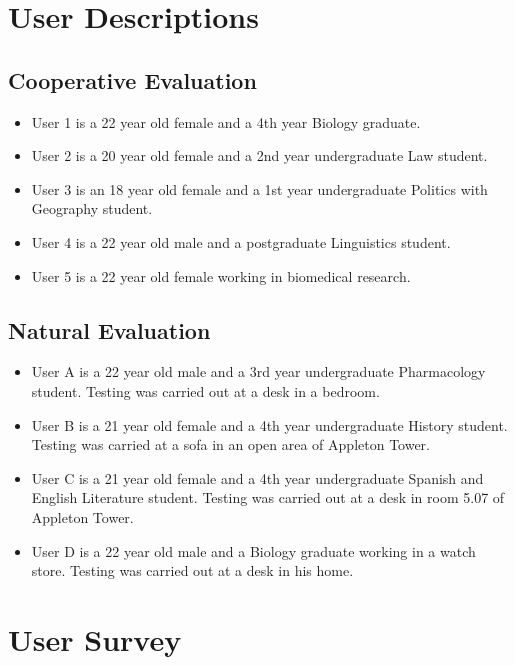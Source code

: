 \documentclass[11pt,twocolumn]{article}
\begin{document}
\onecolumn

\appendix
\appendixpage

\section{User Descriptions}

\subsection{Cooperative Evaluation}

\begin{itemize}
\item User 1 is a 22 year old female and a 4th year Biology graduate.
\item User 2 is a 20 year old female and a 2nd year undergraduate Law student. 
\item User 3 is an 18 year old female and a 1st year undergraduate Politics
with Geography student. 
\item User 4 is a 22 year old male and a postgraduate Linguistics student. 
\item User 5 is a 22 year old female working in biomedical research. 
\end{itemize}

\subsection{Natural Evaluation}

\begin{itemize}
\item User A is a 22 year old male and a 3rd year undergraduate Pharmacology
student. Testing was carried out at a desk in a bedroom.
\item User B is a 21 year old female and a 4th year undergraduate History
student. Testing was carried at a sofa in an open area of Appleton Tower.
\item User C is a 21 year old female and a 4th year undergraduate Spanish and
English Literature student. Testing was carried out at a desk in room 5.07 of
Appleton Tower.
\item User D is a 22 year old male and a Biology graduate working in a watch
store. Testing was carried out at a desk in his home. 
\end{itemize}

\newpage
\section{User Survey}
\end{document}

